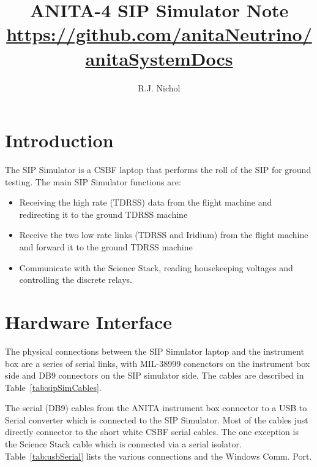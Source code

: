 \documentclass{article}
\begin{document}
\title{ANITA-4 SIP Simulator Note \\
{\small \url{https://github.com/anitaNeutrino/anitaSystemDocs}}}
\author{R.J. Nichol}
  
\maketitle



   
\section{Introduction}
The SIP Simulator is a CSBF laptop that performs the roll of the SIP for ground testing. The main SIP Simulator functions are:
\begin{itemize}
\item Receiving the high rate (TDRSS) data from the flight machine and redirecting it to the ground TDRSS machine
\item Receive the two low rate links (TDRSS and Iridium) from the flight machine and forward it to the ground TDRSS machine
\item Communicate with the Science Stack, reading housekeeping voltages and controlling the discrete relays.
\end{itemize}

\section{Hardware Interface}
The physical connections between the SIP Simulator laptop and the instrument box are a series of serial links, with MIL-38999 conenctors on the instrument box side and DB9 connectors on the SIP simulator side. The cables are described in Table~\ref{tab:sipSimCables}.

The serial (DB9) cables from the ANITA instrument box connector to a USB to Serial converter which is connected to the SIP Simulator. Most of the cables just directly connector to the short white CSBF serial cables. The one exception is the Science Stack cable which is connected via a serial isolator. Table~\ref{tab:usbSerial} lists the various connections and the Windows Comm. Port.
\end{document}
